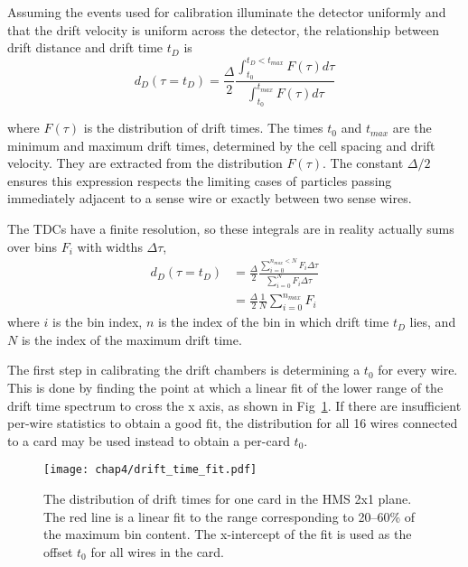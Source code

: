 Assuming the events used for calibration illuminate the detector uniformly
and that the drift velocity is uniform across the detector, the relationship
between drift distance and drift time $t_D$ is
\begin{equation}
    d_D (\tau=t_D) = \frac{\Delta}{2}
                     \frac{\int_{t_0}^{t_D<t_{max}} F(\tau) d\tau}
                          {\int_{t_0}^{t_{max}} F(\tau) d\tau}
\end{equation}

where $F(\tau)$ is the distribution of drift times.
The times $t_0$ and $t_{max}$ are the minimum and maximum drift times,
determined by the cell spacing and drift velocity.
They are extracted from the distribution $F(\tau)$.
The constant $\Delta/2$ ensures this expression respects the limiting cases of
particles passing immediately adjacent to a sense wire or exactly between
two sense wires.


The TDCs have a finite resolution, so these integrals are in reality actually
sums over bins $F_i$ with widths $\Delta\tau$,
\begin{align} \label{eqn:drift_distance}
    d_D (\tau=t_D) &= \frac{\Delta}{2}
                      \frac{\sum_{i=0}^{n_{max}<N} F_i \Delta\tau}
                           {\sum_{i=0}^{N} F_i \Delta\tau} \\
                 &= \frac{\Delta}{2}
                    \frac{1}{N}\sum_{i=0}^{n_{max}} F_i
\end{align}
where $i$ is the bin index,
$n$ is the index of the bin in which drift time $t_D$ lies,
and $N$ is the index of the maximum drift time.


The first step in calibrating the drift chambers is determining a $t_0$ for
every wire.
This is done by finding the point at which a linear fit of the lower range of
the drift time spectrum to cross the x axis, as shown in
Fig~\ref{fig:drift_time_fit}.
If there are insufficient per-wire statistics to obtain a good fit,
the distribution for all 16 wires connected to a card may be used instead to
obtain a per-card $t_0$.

\begin{figure}[!h]
    \centering
    \texttt{[image: chap4/drift\_time\_fit.pdf]}
    \caption[The distribution of drift times for one card in the HMS 2x1 plane.]{
            The distribution of drift times for one card in the HMS 2x1 plane.
            The red line is a linear fit to the range corresponding to 20--60\%
            of the maximum bin content.
            The x-intercept of the fit is used as the offset $t_0$ for all
            wires in the card.
            }
    \label{fig:drift_time_fit}
\end{figure}

